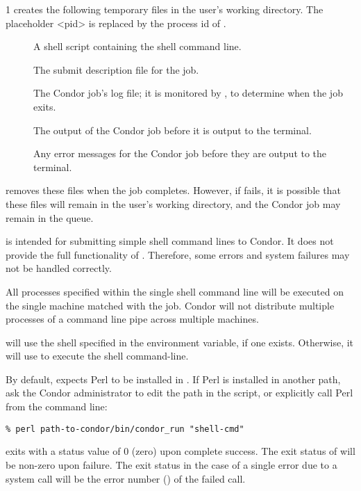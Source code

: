 \begin{ManPage}{\label{man-condor-run}}{1}
 creates the following temporary files in the user's
working directory.
The placeholder <pid> is replaced by the process id
of .
\begin{description}
\item[] A shell script containing the shell
  command line.
\item[] The submit description file for
  the job.
\item[] The Condor job's log file; it is
  monitored by , to determine when the job exits.
\item[] The output of the Condor
  job before it is output to the terminal.
\item[] Any error messages for the Condor
  job  before they are output to the terminal.
\end{description}
 removes these files when the job completes.  However, if
 fails, it is possible that these files will remain in the
user's working directory, and the Condor job may remain in the queue.

\GenRem

 is intended for submitting simple shell command lines to
Condor.  It does not provide the full functionality of
.  Therefore, some  errors and
system failures may not be handled correctly. 

All processes specified within the single shell command line
will be executed on the single machine
matched with the job.  Condor will not distribute multiple
processes of a command line pipe across multiple machines.

 will use the shell specified in the  environment
variable, if one exists.  Otherwise, it will use  to execute
the shell command-line.

By default,  expects Perl to be installed in
.  If Perl is installed in another path, 
ask the Condor administrator to edit the path in the 
script, or explicitly call Perl from the command line:

\begin{verbatim}
% perl path-to-condor/bin/condor_run "shell-cmd"
\end{verbatim}


\ExitStatus

 exits with a status value of 0 (zero) upon complete success.
The exit status of  will be non-zero upon failure.
The exit status in the case of a single error due to a system call
will be the error number () of the failed call.

\end{ManPage}
